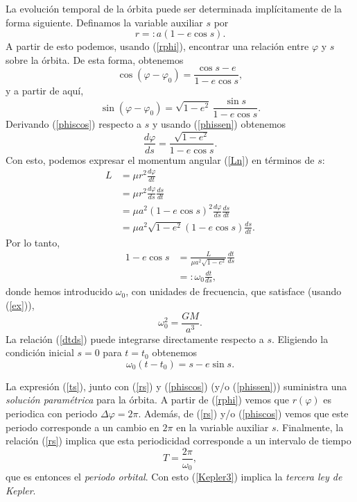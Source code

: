 La evolución temporal de la órbita puede ser determinada implícitamente de la forma siguiente. Definamos la variable auxiliar $s$ por
\begin{equation}\label{rs}
\boxed{r=:a(1-e\cos s).}
\end{equation}
A partir de esto podemos, usando (\ref{rphi}), encontrar una relación entre $\varphi$ y $s$ sobre la órbita. De esta forma, obtenemos
\begin{equation}\label{phiscos}
\boxed{\cos(\varphi-\varphi_0)=\frac{\cos s -e}{1-e\cos s}, }
\end{equation}
y a partir de aquí,
\begin{equation}\label{phissen}
\sin(\varphi-\varphi_0)=\sqrt{1-e^2}\,\frac{\sin s}{1-e\cos s}.
\end{equation}
Derivando (\ref{phiscos}) respecto a $s$ y usando (\ref{phissen}) obtenemos
\begin{equation}
\frac{d\varphi}{ds}=\frac{\sqrt{1-e^2}}{1-e\cos s}.
\end{equation}
Con esto, podemos expresar el momentum angular (\ref{Ln}) en términos de $s$:
\begin{align}
L & = \mu r^2 \frac{d\varphi}{dt} \\
& = \mu r^2 \frac{d\varphi}{ds}\frac{ds}{dt} \\
& = \mu a^2\left(1-e\cos s\right)^2 \frac{d\varphi}{ds}\frac{ds}{dt} \\
& = \mu a^2\sqrt{1-e^2}\left(1-e\cos s\right) \frac{ds}{dt} .
\end{align}
Por lo tanto,
\begin{align}
1-e\cos s & = \frac{L}{\mu a^2\sqrt{1-e^2}} \frac{dt}{ds} \\
& =: \omega_0 \frac{dt}{ds}, \label{dtds}
\end{align}
donde hemos introducido $\omega_0$, con unidades de frecuencia, que satisface (usando (\ref{ex})),
\begin{equation}\label{Kepler3}
\boxed{\omega_0^2=\frac{GM}{a^3}.}
\end{equation}
La relación (\ref{dtds}) puede integrarse directamente respecto a $s$. Eligiendo la condición inicial $s=0$ para $t=t_0$ obtenemos
\begin{equation}\label{ts}
\boxed{\omega_0(t-t_0)=s-e\sin s.}
\end{equation}

La expresión (\ref{ts}), junto con (\ref{rs}) y (\ref{phiscos}) (y/o (\ref{phissen})) suministra una \textit{solución paramétrica} para la órbita.
A partir de (\ref{rphi}) vemos que $r(\varphi)$ es periodica con periodo $\Delta\varphi=2\pi$. Además, de (\ref{rs}) y/o (\ref{phiscos}) vemos que este periodo corresponde a un cambio en $2\pi$ en la variable auxiliar $s$. Finalmente, la relación (\ref{rs}) implica que esta periodicidad corresponde a un intervalo de tiempo
\begin{equation}
T=\frac{2\pi}{\omega_0},
\end{equation}
que es entonces el \textit{periodo orbital}. Con esto (\ref{Kepler3}) implica la \textit{tercera ley de Kepler}.